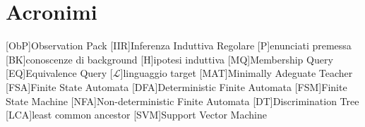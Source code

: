 %
%
\chapter*{Acronimi}
\begin{acronym}[WYSIWYM]
[ObP]{Observation Pack}
[IIR]{Inferenza Induttiva Regolare}
[P]{enunciati premessa}
[BK]{conoscenze di background}
[H]{ipotesi induttiva}
[MQ]{Membership Query}
[EQ]{Equivalence Query}
[$\mathcal{L}$]{linguaggio target}
[MAT]{Minimally Adeguate Teacher}
[FSA]{Finite State Automata}
[DFA]{Deterministic Finite Automata}
[FSM]{Finite State Machine}
[NFA]{Non-deterministic Finite Automata}
[DT]{Discrimination Tree}
[LCA]{least common ancestor}
[SVM]{Support Vector Machine}
\end{acronym}
